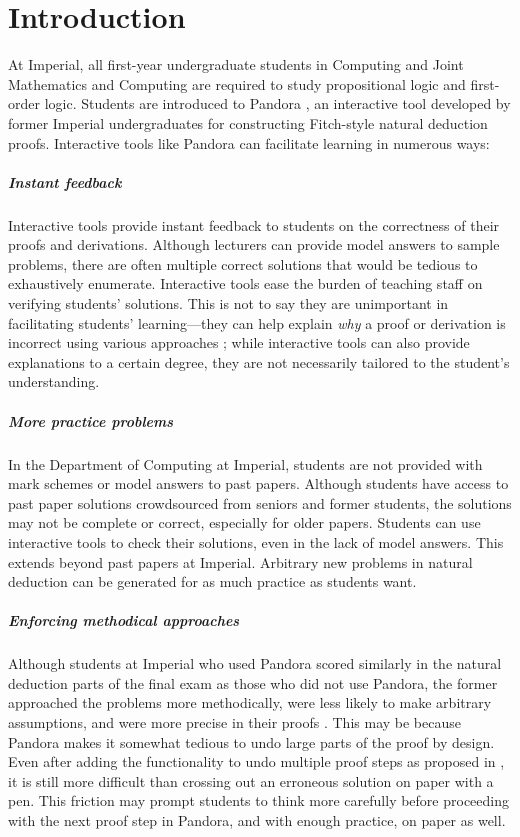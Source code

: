 \chapter{Introduction}
At Imperial, all first-year undergraduate students in Computing and Joint Mathematics and Computing are required to study propositional logic and first-order logic. Students are introduced to Pandora \cite{pandora:2007, pandora}, an interactive tool developed by former Imperial undergraduates for constructing Fitch-style natural deduction proofs. Interactive tools like Pandora can facilitate learning in numerous ways:

\paragraph{Instant feedback}
Interactive tools provide instant feedback to students on the correctness of their proofs and derivations. Although lecturers can provide model answers to sample problems, there are often multiple correct solutions that would be tedious to exhaustively enumerate. Interactive tools ease the burden of teaching staff on verifying students' solutions. This is not to say they are unimportant in facilitating students' learning---they can help explain \textit{why} a proof or derivation is incorrect using various approaches \cite{nipkow:2012}; while interactive tools can also provide explanations to a certain degree, they are not necessarily tailored to the student's understanding.

\paragraph{More practice problems}
In the Department of Computing at Imperial, students are not provided with mark schemes or model answers to past papers. Although students have access to past paper solutions crowdsourced from seniors and former students, the solutions may not be complete or correct, especially for older papers. Students can use interactive tools to check their solutions, even in the lack of model answers. This extends beyond past papers at Imperial. Arbitrary new problems in natural deduction can be generated \cite{ahmed:2013} for as much practice as students want.

\paragraph{Enforcing methodical approaches}
Although students at Imperial who used Pandora scored similarly in the natural deduction parts of the final exam as those who did not use Pandora, the former approached the problems more methodically, were less likely to make arbitrary assumptions, and were more precise in their proofs \cite{pandora:2007}. This may be because Pandora makes it somewhat tedious to undo large parts of the proof by design. Even after adding the functionality to undo multiple proof steps as proposed in \cite{pandora:2007}, it is still more difficult than crossing out an erroneous solution on paper with a pen. This friction may prompt students to think more carefully before proceeding with the next proof step in Pandora, and with enough practice, on paper as well.

